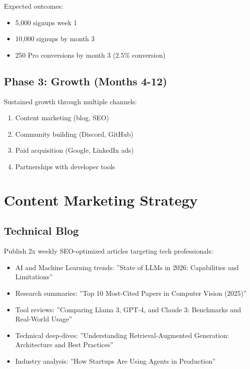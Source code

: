\documentclass{report}
\begin{document}
Expected outcomes:
\begin{itemize}
    \item 5,000 signups week 1
    \item 10,000 signups by month 3
    \item 250 Pro conversions by month 3 (2.5\% conversion)
\end{itemize}

\subsection{Phase 3: Growth (Months 4-12)}

Sustained growth through multiple channels:

\begin{enumerate}
    \item Content marketing (blog, SEO)
    \item Community building (Discord, GitHub)
    \item Paid acquisition (Google, LinkedIn ads)
    \item Partnerships with developer tools
\end{enumerate}

\section{Content Marketing Strategy}

\subsection{Technical Blog}

Publish 2x weekly SEO-optimized articles targeting tech professionals:

\begin{itemize}
    \item AI and Machine Learning trends: ''State of LLMs in 2026: Capabilities and Limitations''
    \item Research summaries: ''Top 10 Most-Cited Papers in Computer Vision (2025)''
    \item Tool reviews: ''Comparing Llama 3, GPT-4, and Claude 3: Benchmarks and Real-World Usage''
    \item Technical deep-dives: ''Understanding Retrieval-Augmented Generation: Architecture and Best Practices''
    \item Industry analysis: ''How Startups Are Using Agents in Production''
\end{itemize}
\end{document}
